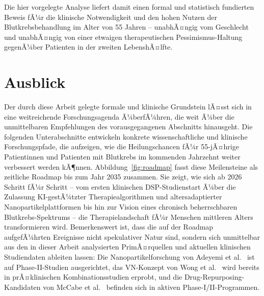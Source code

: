 ﻿\documentclass[12pt,a4paper]{article}
\theoremstyle{definition}
\begin{document}
Die hier vorgelegte Analyse liefert damit einen formal und statistisch fundierten
Beweis fÃ¼r die klinische Notwendigkeit und den hohen Nutzen der Blutkrebsbehandlung
im Alter von 55 Jahren -- unabhÃ¤ngig vom Geschlecht und unabhÃ¤ngig von einer
etwaigen therapeutischen Pessimismus-Haltung gegenÃ¼ber Patienten in der zweiten
LebenshÃ¤lfte.

\section{Ausblick}
\label{sec:ausblick}

Der durch diese Arbeit gelegte formale und klinische Grundstein lÃ¤sst sich in eine
weitreichende Forschungsagenda Ã¼berfÃ¼hren, die weit Ã¼ber die unmittelbaren
Empfehlungen des vorausgegangenen Abschnitts hinausgeht. Die folgenden Unterab\-schnitte
entwickeln konkrete wissenschaftliche und klinische Forschungspfade, die aufzeigen,
wie die Heilungschancen fÃ¼r 55-jÃ¤hrige Patientinnen und Patienten mit Blutkrebs im
kommenden Jahrzehnt weiter verbessert werden kÃ¶nnen. Abbildung~\ref{fig:roadmap}
fasst diese Meilensteine als zeitliche Roadmap bis zum Jahr 2035 zusammen. Sie zeigt,
wie sich ab 2026 Schritt fÃ¼r Schritt -- vom ersten klinischen DSP-Studienstart Ã¼ber
die Zulassung KI-gestÃ¼tzter Therapiealgorithmen und altersadaptierter Nanopartikelplattformen
bis hin zur Vision eines chronisch beherrschbaren Blutkrebs-Spektrums -- die
Therapielandschaft fÃ¼r Menschen mittleren Alters transformieren wird. Bemerkenswert
ist, dass die auf der Roadmap aufgefÃ¼hrten Ereignisse nicht spekulativer Natur sind,
sondern sich unmittelbar aus den in dieser Arbeit analysierten PrimÃ¤rquellen und
aktuellen klinischen Studiendaten ableiten lassen: Die Nanopartikelforschung von
Adeyemi et al.\ \cite{adeyemi2025} ist auf Phase-II-Studien ausgerichtet, das
VN-Konzept von Wong et al.\ \cite{wong2016} wird bereits in prÃ¤klinischen
Kombinationsstudien erprobt, und die Drug-Repurposing-Kandidaten von McCabe et al.\
\cite{mccabe2015} befinden sich in aktiven Phase-I/II-Programmen.
\end{document}
